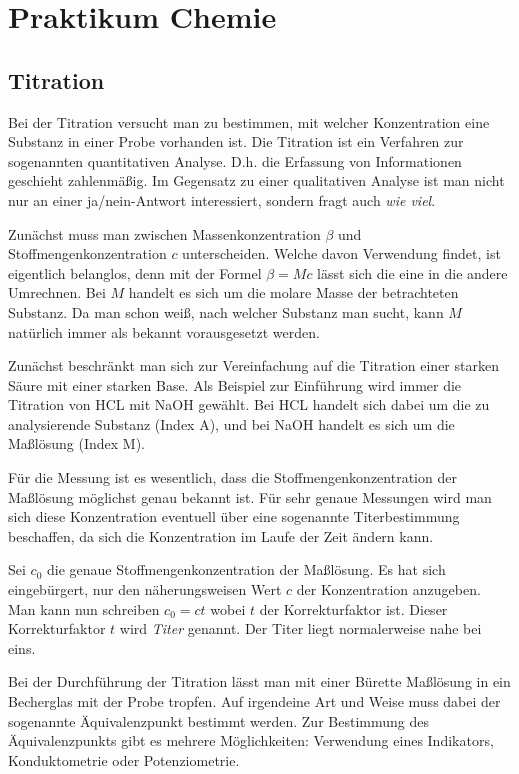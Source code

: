 \documentclass[a4paper,11pt,fleqn,twocolumn,dvipdfmx]{scrartcl}
\begin{document}
\thispagestyle{empty}
\section*{Praktikum Chemie}
\subsection*{Titration}

Bei der Titration versucht man zu bestimmen, mit welcher Konzentration
eine Substanz in einer Probe vorhanden ist. Die Titration ist
ein Verfahren zur sogenannten quantitativen Analyse. D.h. die
Erfassung von Informationen geschieht zahlenmäßig. Im Gegensatz zu
einer qualitativen Analyse ist man nicht nur an einer ja/nein-Antwort
interessiert, sondern fragt auch \textit{wie viel}.

Zunächst muss man zwischen Massenkonzentration $\beta$ und
Stoffmengenkonzentration $c$ unterscheiden. Welche davon Verwendung
findet,
ist eigentlich belanglos, denn mit der Formel $\beta = Mc$ lässt
sich die eine in die andere Umrechnen. Bei $M$ handelt es sich
um die molare Masse der betrachteten Substanz. Da man schon weiß,
nach welcher Substanz man sucht, kann $M$ natürlich immer
als bekannt vorausgesetzt werden.

Zunächst beschränkt man sich zur Vereinfachung auf die Titration
einer starken Säure mit einer starken Base. Als Beispiel zur
Einführung wird immer die Titration von HCL mit NaOH gewählt.
Bei HCL handelt sich dabei um die zu analysierende Substanz (Index A),
und bei NaOH handelt es sich um die Maßlösung (Index M).

Für die Messung ist es wesentlich, dass die Stoffmengenkonzentration
der Maßlösung möglichst genau bekannt ist. Für sehr genaue Messungen
wird man sich diese Konzentration eventuell über eine sogenannte
Titerbestimmung beschaffen, da sich die Konzentration im Laufe
der Zeit ändern kann.

Sei $c_0$ die genaue Stoffmengenkonzentration der Maßlösung. Es hat sich
eingebürgert, nur den näherungsweisen Wert $c$ der Konzentration
anzugeben. Man kann nun schreiben $c_0=ct$ wobei $t$ der
Korrekturfaktor ist. Dieser Korrekturfaktor $t$ wird \emph{Titer}
genannt. Der Titer liegt normalerweise nahe bei eins.

Bei der Durchführung der Titration lässt man mit einer Bürette Maßlösung
in ein Becherglas mit der Probe tropfen. Auf irgendeine Art und
Weise muss dabei der sogenannte Äquivalenzpunkt bestimmt werden.
Zur Bestimmung des Äquivalenzpunkts gibt es mehrere Möglichkeiten:
Verwendung eines Indikators, Konduktometrie oder Potenziometrie.
\end{document}
